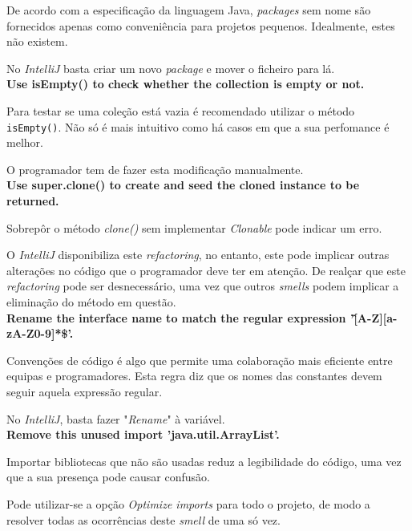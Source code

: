 \documentclass[a4paper]{report}
\begin{document}
\begin{itemize}
    De acordo com a especificação da linguagem Java, \textit{packages} sem nome são fornecidos apenas como conveniência para projetos pequenos. Idealmente, estes não existem.
    
    No \textit{IntelliJ} basta criar um novo \textit{package} e mover o ficheiro para lá.\\
    

    \textbf{Use isEmpty() to check whether the collection is empty or not.}
    
    Para testar se uma coleção está vazia é recomendado utilizar o método \texttt{isEmpty()}. Não só é mais intuitivo como há casos em que a sua perfomance é melhor.
    
    O programador tem de fazer esta modificação manualmente.\\
    

    \textbf{Use super.clone() to create and seed the cloned instance to be returned.}
    
    Sobrepôr o método \textit{clone()} sem implementar \textit{Clonable} pode indicar um erro.
    
    O \textit{IntelliJ} disponibiliza este \textit{refactoring}, no entanto, este pode implicar outras alterações no código que o programador deve ter em atenção.
    De realçar que este \textit{refactoring} pode ser desnecessário, uma vez que outros \textit{smells} podem implicar a eliminação do método em questão. \\
    

    \textbf{Rename the interface name to match the regular expression '\^[A-Z][a-zA-Z0-9]*\$'.}
    
    Convenções de código é algo que permite uma colaboração mais eficiente entre equipas e programadores. Esta regra diz que os nomes das constantes devem seguir aquela expressão regular.
    
    No \textit{IntelliJ}, basta fazer "\textit{Rename}" à variável. \\
    

    \textbf{Remove this unused import 'java.util.ArrayList'.}
    
    Importar bibliotecas que não são usadas reduz a legibilidade do código, uma vez que a sua presença pode causar confusão.
    
    Pode utilizar-se a opção \textit{Optimize imports} para todo o projeto, de modo a resolver todas as ocorrências deste \textit{smell} de uma só vez. \\
    


\end{itemize}
\end{document}
